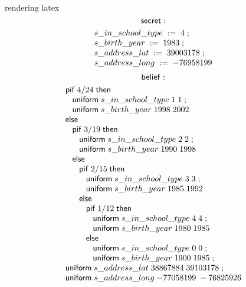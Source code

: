 rendering latex
$$ \mathsf{secret}: $$
\begin{displaymath}{\small
\begin{array}{l}
  \sassign{s\text{\_}in\text{\_}school\text{\_}type}{4}\; ;\\
  \sassign{s\text{\_}birth\text{\_}year}{1983}\; ;\\
  \sassign{s\text{\_}address\text{\_}lat}{39003178}\; ;\\
  \sassign{s\text{\_}address\text{\_}long}{-76958199}\\
\end{array}
}
\end{displaymath}
$$ \mathsf{belief}: $$
\begin{displaymath}{\small
\begin{array}{l}
  \spifk\; 4/24 \; \sthenk\\
  \;\;\;\suniform{s\text{\_}in\text{\_}school\text{\_}type}{1}{1}\; ;\\
  \;\;\;\suniform{s\text{\_}birth\text{\_}year}{1998}{2002}\\
  \selsek\\
  \;\;\;\spifk\; 3/19 \; \sthenk\\
  \;\;\;\;\;\;\suniform{s\text{\_}in\text{\_}school\text{\_}type}{2}{2}\; ;\\
  \;\;\;\;\;\;\suniform{s\text{\_}birth\text{\_}year}{1990}{1998}\\
  \;\;\;\selsek\\
  \;\;\;\;\;\;\spifk\; 2/15 \; \sthenk\\
  \;\;\;\;\;\;\;\;\;\suniform{s\text{\_}in\text{\_}school\text{\_}type}{3}{3}\; ;\\
  \;\;\;\;\;\;\;\;\;\suniform{s\text{\_}birth\text{\_}year}{1985}{1992}\\
  \;\;\;\;\;\;\selsek\\
  \;\;\;\;\;\;\;\;\;\spifk\; 1/12 \; \sthenk\\
  \;\;\;\;\;\;\;\;\;\;\;\;\suniform{s\text{\_}in\text{\_}school\text{\_}type}{4}{4}\; ;\\
  \;\;\;\;\;\;\;\;\;\;\;\;\suniform{s\text{\_}birth\text{\_}year}{1980}{1985}\\
  \;\;\;\;\;\;\;\;\;\selsek\\
  \;\;\;\;\;\;\;\;\;\;\;\;\suniform{s\text{\_}in\text{\_}school\text{\_}type}{0}{0}\; ;\\
  \;\;\;\;\;\;\;\;\;\;\;\;\suniform{s\text{\_}birth\text{\_}year}{1900}{1985}\; ;\\
  \suniform{s\text{\_}address\text{\_}lat}{38867884}{39103178}\; ;\\
  \suniform{s\text{\_}address\text{\_}long}{-77058199}{-76825926}\\
\end{array}
}
\end{displaymath}

